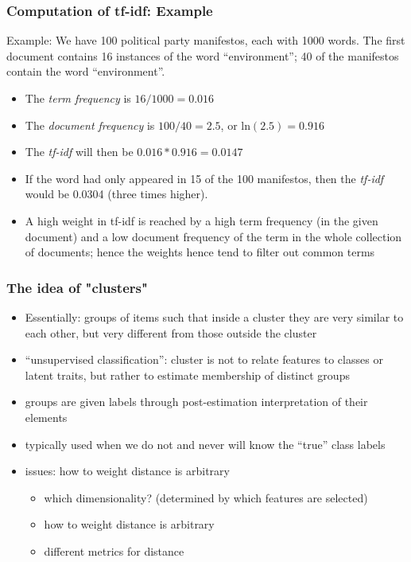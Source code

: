 \documentclass{beamer}
\begin{document}
\begin{frame}
	\frametitle{Computation of tf-idf: Example}
	Example: We have 100 political party manifestos, each with 1000
	words.  The first document contains 16 instances of the word
	``environment''; 40 of the manifestos contain the word
	``environment''.
	\vspace{2ex}
	\begin{itemize}
		\setlength{\itemsep}{1.2ex}
		\item The \emph{term frequency} is $16/1000 = 0.016$
		\item The \emph{document frequency} is $100/40 = 2.5$, or
		ln$(2.5)=0.916$
		\item The \emph{tf-idf} will then be $0.016 * 0.916 = 0.0147$
		\item \pause If the word had only appeared in 15 of the 100 manifestos,
		then the \emph{tf-idf} would be 0.0304 (three times higher).
		\item \pause A high weight in tf-idf is reached by a high term frequency
		(in the given document) and a low document frequency of the term
		in the whole collection of documents; hence the \alert{weights hence tend to
			filter out common terms}
	\end{itemize}
\end{frame}



\begin{frame}
	\frametitle{The idea of "clusters"}
	\begin{itemize}
		\item Essentially: groups of items such that inside a cluster they
		are very similar to each other, but very different from those
		outside the cluster
		\item ``unsupervised classification'': cluster is not to relate
		features to classes or latent traits, but rather to estimate
		membership of distinct groups
		\pause \item groups are given labels through post-estimation interpretation
		of their elements
		\item typically used when we do not and never will know the ``true''
		class labels
		\item issues: how to weight distance is arbitrary
		\begin{itemize}
			\pause \item which dimensionality? (determined by which
			features are selected)
			\pause \item how to weight distance is arbitrary
			\pause \item different metrics for distance
		\end{itemize}
	\end{itemize}
\end{frame}
\end{document}
